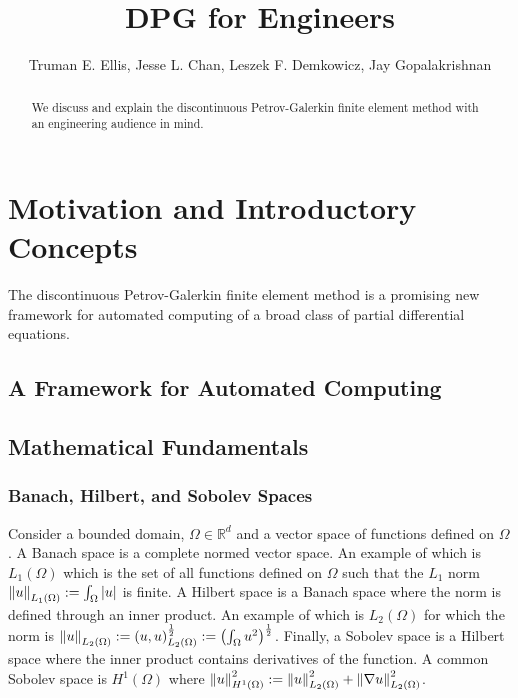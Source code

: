 \documentclass{article}
\title{DPG for Engineers}
\author{Truman E. Ellis, Jesse L. Chan, Leszek F. Demkowicz, Jay Gopalakrishnan}
\begin{document}
\maketitle

\begin{abstract}
We discuss and explain the discontinuous Petrov-Galerkin finite element method with an engineering audience in mind.
\end{abstract}

\section{Motivation and Introductory Concepts}
The discontinuous Petrov-Galerkin finite element method is a promising new framework 
for automated computing of a broad class of partial differential equations.

\subsection{A Framework for Automated Computing}

\subsection{Mathematical Fundamentals}

\subsubsection{Banach, Hilbert, and Sobolev Spaces}
Consider a bounded domain, $\Omega\in\mathbb{R}^d$ and a vector space of functions defined on $\Omega$.
A Banach space is a complete normed vector space.
An example of which is $L_1(\Omega)$ which is the set of all functions defined on $\Omega$ such that the $L_1$ norm
$\left\| u \right\|_{L_1(\Omega)}:=\int_\Omega|u|$ is finite.
A Hilbert space is a Banach space where the norm is defined through an inner product.
An example of which is $L_2(\Omega)$ for which the norm is
$\left\| u \right\|_{L_2(\Omega)}:=\left( u,u \right)_{L_2(\Omega)}^{\frac{1}{2}}:=\left( \int_\Omega u^2 \right)^{\frac{1}{2}}$.
Finally, a Sobolev space is a Hilbert space where the inner product contains derivatives of the function.
A common Sobolev space is $H^1(\Omega)$ where $\left\| u \right\|_{H^1(\Omega)}^2:=\left\| u \right\|_{L_2(\Omega)}^2+\left\| \nabla u \right\|_{L_2(\Omega)}^2$.
\end{document}
